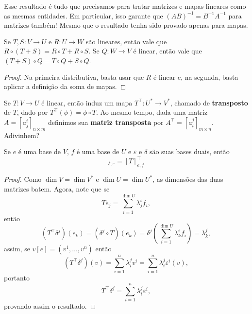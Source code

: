 Esse resultado é tudo que precisamos para tratar matrizes e mapas lineares como as mesmas entidades. Em particular, isso garante que $(AB)^{-1} = B^{-1}A^{-1}$ para matrizes também! Mesmo que o resultado tenha sido provado apenas para mapas.

\begin{proposition}
    Se $T, S \colon V \to U$ e $R \colon U \to W$ são lineares, então vale que $R \circ (T + S) = R \circ T + R \circ S$. Se $Q \colon W \to V$ é linear, então vale que $(T + S) \circ Q = T \circ Q + S \circ Q$.
\end{proposition}
\begin{proof}
    Na primeira distributiva, basta usar que $R$ é linear e, na segunda, basta aplicar a definição da soma de mapas.
\end{proof}

Se $T \colon V \to U$ é linear, então induz um mapa $T^\top \colon U^* \to V^*$, chamado de \textbf{transposto} de $T$, dado por $T^\top(\phi) = \phi \circ T$. Ao mesmo tempo, dada uma matriz $A = [a^i_j]_{n \times m}$ definimos sua \textbf{matriz transposta} por $A^\top = [a^j_i]_{m \times n}$. Adivinhem?

\begin{proposition}
    Se $e$ é uma base de $V$, $f$ é uma base de $U$ e $\varepsilon$ e $\delta$ são suas bases duais, então \begin{equation}
        [T']_{\delta, \varepsilon} = [T]_{e, f}^\top
    \end{equation}
\end{proposition}
\begin{proof}
    Como $\dim V = \dim V^*$ e $\dim U = \dim U^*$, as dimensões das duas matrizes batem. Agora, note que se \begin{equation}
        Te_j = \sum_{i = 1}^{\dim U} \lambda^i_j f_i,
    \end{equation} então \begin{equation}
        (T^\top \delta^j)(e_k) = (\delta^j \circ T)(e_k) = \delta^j\left(\sum_{i = 1}^{\dim U} \lambda^i_k f_i\right) = \lambda^j_k,
    \end{equation} assim, se $v[e] = (v^1, \dots, v^n)$ então \begin{equation}
        (T^\top\delta^j)(v) = \sum_{i = 1}^{n} \lambda^j_i v^i = \sum_{i = 1}^n \lambda^j_i \varepsilon^i(v),
    \end{equation} portanto \begin{equation}
        T^\top \delta^j = \sum_{i = 1}^n \lambda^j_i \varepsilon^i,
    \end{equation} provando assim o resultado.
\end{proof}


